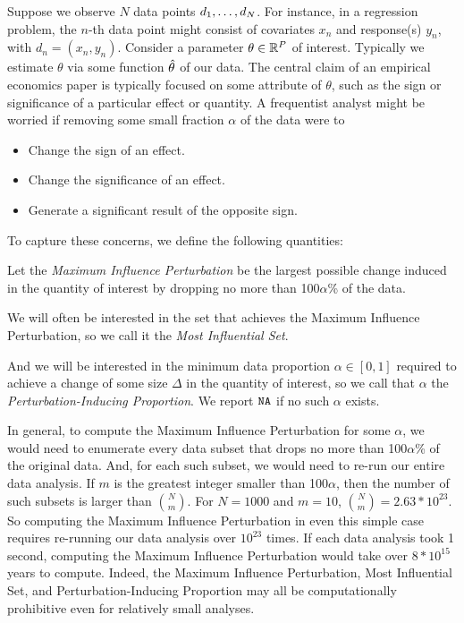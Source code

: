 

Suppose we observe $N$ data points $\d_{1}, \ldots, \d_{N}$. For instance, in a
regression problem, the $n$-th data point might consist of covariates $x_n$ and
response(s) $y_n$, with $d_n = (x_n,y_n)$. Consider a parameter $\theta \in
\mathbb{R}^{\P}$ of interest. Typically we estimate $\theta$ via some function
$\thetahat$ of our data. The central claim of an empirical economics paper is
typically focused on some attribute of $\theta$, such as the sign or
significance of a particular effect or quantity. A frequentist analyst might be
worried if removing some small fraction $\alpha$ of the data were to
%
\begin{itemize}
\item Change the sign of an effect.
\item Change the significance of an effect.
\item Generate a significant result of the opposite sign.
\end{itemize}
%
To capture these concerns, we define the following quantities:
%
\begin{defn} 
Let the \emph{Maximum Influence Perturbation} be the largest possible change
induced in the quantity of interest by dropping no more than 100$\alpha$\% of
the data.

We will often be interested in the set that achieves the Maximum Influence
Perturbation, so we call it the \emph{Most Influential Set}.

And we will be interested in the minimum data proportion $\alpha \in [0,1]$
required to achieve a change of some size $\Delta$ in the quantity of interest,
so we call that $\alpha$ the \emph{Perturbation-Inducing Proportion}. We report
$\na$ if no such $\alpha$ exists.
%
\end{defn}

In general, to compute the Maximum Influence Perturbation for some $\alpha$, we
would need to enumerate every data subset that drops no more than 100$\alpha$\%
of the original data. And, for each such subset, we would need to re-run our
entire data analysis. If $m$ is the greatest integer smaller than 100$\alpha$,
then the number of such subsets is larger than $\binom{N}{m}$. For $N = 1000$ and
$m=10$, $\binom{N}{m} = 2.63 * 10^{23}$. So computing the Maximum Influence
Perturbation in even this simple case requires re-running our data analysis over
$10^{23}$ times. If each data analysis took 1 second, computing the Maximum
Influence Perturbation would take over $8 * 10^{15}$ years to compute. Indeed, the Maximum
Influence Perturbation, Most Influential Set, and Perturbation-Inducing
Proportion may all be computationally prohibitive even for relatively small
analyses.

